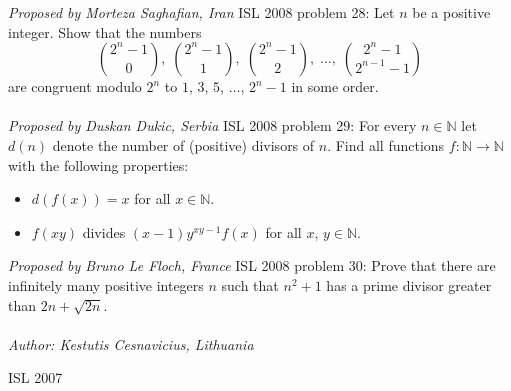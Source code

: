 \textit{Proposed by Morteza Saghafian, Iran} 
ISL 2008 problem 28:  Let $ n$ be a positive integer. Show that the numbers
\[
\binom{2^n - 1}{0},\; \binom{2^n - 1}{1},\; \binom{2^n - 1}{2},\; \ldots,\; \binom{2^n - 1}{2^{n - 1} - 1}
\]
are congruent modulo $ 2^n$ to $ 1$, $ 3$, $ 5$, $ \ldots$, $ 2^n - 1$ in some order. \\\\
\textit{Proposed by Duskan Dukic, Serbia} 
ISL 2008 problem 29:  For every $ n\in\mathbb{N}$ let $ d(n)$ denote the number of (positive) divisors of $ n$. Find all functions $ f: \mathbb{N}\to\mathbb{N}$ with the following properties:
\begin{itemize}
  \item $ d\left(f(x)\right) = x$ for all $ x\in\mathbb{N}$.
  \item $ f(xy)$ divides $ (x - 1)y^{xy - 1}f(x)$ for all $ x$, $ y\in\mathbb{N}$.
\end{itemize}
\textit{Proposed by Bruno Le Floch, France} 
ISL 2008 problem 30:  Prove that there are infinitely many positive integers $ n$ such that $ n^2 + 1$ has a prime divisor greater than $ 2n + \sqrt {2n}$. \\\\
\textit{Author: Kestutis Cesnavicius, Lithuania} 

ISL 2007 

